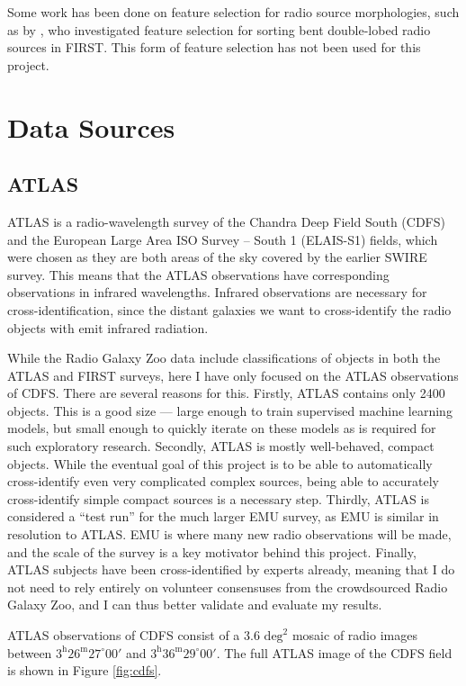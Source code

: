 \documentclass[a4paper]{article}
\newcommand{\fig}{Figure }
\begin{document}
      Some work has been done on feature selection for radio source morphologies, such as by \citet{proctor06}, who investigated feature selection for sorting bent double-lobed radio sources in FIRST. This form of feature selection has not been used for this project.

  \section{Data Sources}

    \subsection{ATLAS}
    \label{sec:atlas}

      ATLAS is a radio-wavelength survey of the Chandra Deep Field South (CDFS) and the European Large Area ISO Survey -- South 1 (ELAIS-S1) fields, which were chosen as they are both areas of the sky covered by the earlier SWIRE survey. This means that the ATLAS observations have corresponding observations in infrared wavelengths\cite{franzen15}. Infrared observations are necessary for cross-identification, since the distant galaxies we want to cross-identify the radio objects with emit infrared radiation.

      While the Radio Galaxy Zoo data include classifications of objects in both the ATLAS and FIRST surveys, here I have only focused on the ATLAS observations of CDFS. There are several reasons for this. Firstly, ATLAS contains only 2400 objects. This is a good size --- large enough to train supervised machine learning models, but small enough to quickly iterate on these models as is required for such exploratory research. Secondly, ATLAS is mostly well-behaved, compact objects. While the eventual goal of this project is to be able to automatically cross-identify even very complicated complex sources, being able to accurately cross-identify simple compact sources is a necessary step. Thirdly, ATLAS is considered a ``test run'' for the much larger EMU survey, as EMU is similar in resolution to ATLAS\cite{franzen15}. EMU is where many new radio observations will be made, and the scale of the survey is a key motivator behind this project. Finally, ATLAS subjects have been cross-identified by experts already\cite{norris06}, meaning that I do not need to rely entirely on volunteer consensuses from the crowdsourced Radio Galaxy Zoo, and I can thus better validate and evaluate my results.

      ATLAS observations of CDFS consist of a $3.6 \text{ deg}^2$ mosaic of radio images between $3^\text{h}26^\text{m} 27^\circ 00'$ and $3^\text{h}36^\text{m} 29^\circ 00'$. The full ATLAS image of the CDFS field is shown in \fig \ref{fig:cdfs}.
\end{document}
